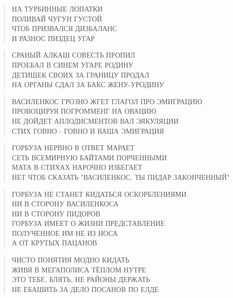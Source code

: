 \poemtitle{***}
\begin{verse}
НА ТУРБИННЫЕ ЛОПАТКИ\\
ПОЛИВАЙ ЧУГУН ГУСТОЙ\\
ЧТОБ ПРИЗВАЛСЯ ДИЗБАЛАНС\\
И РАЗНОС ПИЗДЕЦ УГАР
\end{verse}

\poemtitle{***}
\begin{verse}
СРАНЫЙ АЛКАШ СОВЕСТЬ ПРОПИЛ\\
ПРОЕБАЛ В СИНЕМ УГАРЕ РОДИНУ\\
ДЕТИШЕК СВОИХ ЗА ГРАНИЦУ ПРОДАЛ\\
НА ОРГАНЫ СДАЛ ЗА БАКС ЖЕНУ-УРОДИНУ
\end{verse}

\poemtitle{***}
\begin{verse}
ВАСИЛЕНКОС ГРОЗНО ЖГЕТ ГЛАГОЛ ПРО ЭМИГРАЦИЮ\\
ПРОВОЦИРУЯ ПОГРОММЕНГ НА ОВАЦИЮ\\
НЕ ДОЙДЕТ АПЛОДИСМЕНТОВ ВАЛ ЭЯКУЛЯЦИИ\\
СТИХ ГОВНО - ГОВНО И ВАША ЭМИГРАЦИЯ
\end{verse}

\poemtitle{***}
\begin{verse}
ГОРБУЗА НЕРВНО В ОТВЕТ МАРАЕТ \\
СЕТЬ ВСЕМИРНУЮ БАЙТАМИ ПОРЧЕННЫМИ\\
МАТА В СТИХАХ НАРОЧНО ИЗБЕГАЕТ\\
НЕТ ЧТОБ СКАЗАТЬ "ВАСИЛЕНКОС, ТЫ ПИДАР ЗАКОНЧЕННЫЙ"
\end{verse}

\poemtitle{***}
\begin{verse}
ГОРБУЗА НЕ СТАНЕТ КИДАТЬСЯ ОСКОРБЛЕНИЯМИ\\
НИ В СТОРОНУ ВАСИЛЕНКОСА\\
НИ В СТОРОНУ ПИДОРОВ\\
ГОРБУЗА ИМЕЕТ О ЖИЗНИ ПРЕДСТАВЛЕНИЕ\\
ПОЛУЧЕННОЕ ИМ НЕ ИЗ НОСА\\
А ОТ КРУТЫХ ПАЦАНОВ
\end{verse}

\poemtitle{***}
\begin{verse}
ЧИСТО ПОНЯТИЯ МОДНО КИДАТЬ\\
ЖИВЯ В МЕГАПОЛИСА ТЁПЛОМ НУТРЕ\\
ЭТО ТЕБЕ, БЛЯТЬ, НЕ РАЙОНЫ ДЕРЖАТЬ\\
НЕ ЕБАШИТЬ ЗА ДЕЛО ПОСАНОВ ПО ЕЛДЕ
\end{verse}

